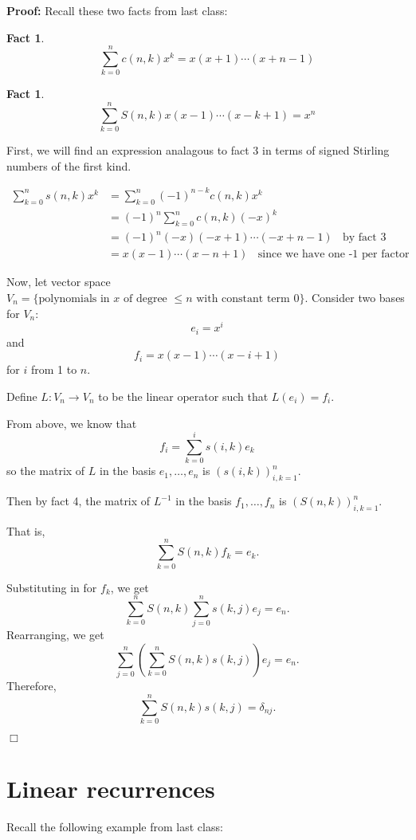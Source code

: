 \documentclass[11pt]{article}
\newtheorem{fact}[theorem]{Fact}
\newenvironment{proof}{\noindent \textbf{Proof:}}{$\Box$}
\begin{document}
\begin{proof}
Recall these two facts from last class:
\begin{fact}
$$\sum_{k=0}^n{c(n,k)x^k} = x(x+1)\cdots(x+n-1)$$
\end{fact}
\begin{fact}
$$\sum_{k=0}^n{S(n,k)x(x-1)\cdots(x-k+1)} = x^n$$
\end{fact}

First, we will find an expression analagous to fact 3 in terms of signed Stirling numbers of the first kind.

$$
\begin{aligned}
\sum_{k=0}^n{s(n,k)x^k} &= \sum_{k=0}^n{(-1)^{n-k}c(n,k)x^k} \\
                        &= (-1)^n \sum_{k=0}^n{c(n,k)(-x)^k} \\
                        &= (-1)^n (-x)(-x+1)\cdots(-x+n-1) ~~~~ \text{by fact 3} \\
                        &= x(x-1)\cdots(x-n+1) ~~~~ \text{since we have one -1 per factor}
\end{aligned}
$$

Now, let vector space $V_n = \{\text{polynomials in $x$ of degree $\leq n$ with constant term 0}\}$.  Consider two bases for $V_n$:
$$e_i = x^i$$
and
$$f_i = x(x-1)\cdots(x-i+1)$$
for $i$ from 1 to $n$.

Define $L:V_n \rightarrow V_n$ to be the linear operator such that $L(e_i) = f_i$.

From above, we know that
$$f_i = \sum_{k=0}^i{s(i,k)e_k}$$
so the matrix of $L$ in the basis $e_1,\ldots,e_n$ is $(s(i,k))_{i,k=1}^n$.

Then by fact 4, the matrix of $L^{-1}$ in the basis $f_1,\ldots,f_n$ is $(S(n,k))_{i,k=1}^n$.

That is,
$$\sum_{k=0}^n{S(n,k)f_k} = e_k.$$

Substituting in for $f_k$, we get
$$\sum_{k=0}^n{S(n,k)\sum_{j=0}^n{s(k,j)e_j}} = e_n.$$
Rearranging, we get
$$\sum_{j=0}^n{\left(\sum_{k=0}^n{S(n,k)s(k,j)}\right)e_j} = e_n.$$
Therefore,
$$\sum_{k=0}^n{S(n,k)s(k,j)} = \delta_{nj}.$$

\end{proof}


\section{Linear recurrences}
Recall the following example from last class:
\end{document}

